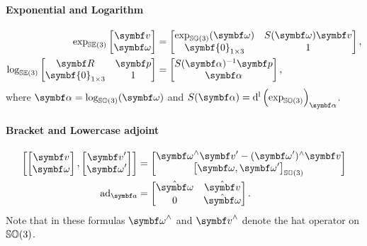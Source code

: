 \begin{properties}[breakable, title={$\SEthree$ formula sheet}]
  \paragraph{Exponential and Logarithm}
  \begin{subequations}
    \label{eq:se3_exp_log}
    \begin{align}
      \label{eq:se3_exp}
      \exp_\SEthree \begin{bmatrix}
        \bv \\ \bomega
      \end{bmatrix} & = \begin{bmatrix}
        \exp_{\SOthree}(\bomega) & S(\bomega) \symbf v \\ \symbf{0}_{1 \times 3} & 1
      \end{bmatrix}, \\
      \label{eq:se3_log}
      \log_\SEthree \begin{bmatrix}
        \bR & \bp \\ \symbf{0}_{1 \times 3} & 1
      \end{bmatrix} & = \begin{bmatrix}
        S(\symbf \alpha)^{-1} \bp \\
        \symbf \alpha
      \end{bmatrix},
    \end{align}
  \end{subequations}
  where $\symbf \alpha = \log_\SOthree(\bomega)$ and $S(\symbf \alpha) = \dl \left( \exp_\SOthree \right)_{\symbf \alpha}$.

  \paragraph{Bracket and Lowercase adjoint}
  \begin{align}
    \left[ \begin{bmatrix}
        \bv \\ \bomega
      \end{bmatrix}, \begin{bmatrix} \bv' \\ \bomega' \end{bmatrix}  \right] & = \begin{bmatrix} \bomega^\wedge \bv' - (\bomega')^\wedge \bv \\ \left[ \bomega, \bomega' \right]_\SOthree \end{bmatrix}   \\
    \ad_{\a}                                                               & =  \begin{bmatrix}  \hat \bomega & \hat \bv \\ 0 & \hat \bomega \end{bmatrix}.
  \end{align}
  Note that in these formulas $\bomega^\wedge$ and $\bv^\wedge$ denote the hat operator on ${\mathbb{SO}(3)}$.


\end{properties}
